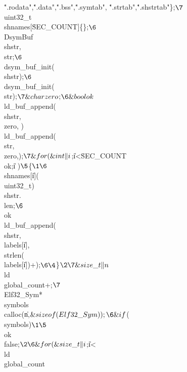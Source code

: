 \.{".rodata"},\.{".data"},\.{".bss"},\.{".symtab"},%
\.{".strtab"},\.{".shstrtab"}\};{}$\7
${}\\{uint32\_t}\\{shnames}[\.{SEC\_COUNT}]\K\{\};{}$\6
${}\\{DsymBuf}\\{shstr},\\{str};{}$\6
${}\\{dsym\_buf\_init}({\AND}\\{shstr});{}$\6
${}\\{dsym\_buf\_init}({\AND}\\{str});{}$\7
\&{char} \\{zero}${}\K{};{}$\6
\&{bool} \\{ok}${}\K\\{ld\_buf\_append}({\AND}\\{shstr},\\{zero},%
)\W\\{ld\_buf\_append}({\AND}\\{str},\\{zero},);{}$\7
\&{for} (\&{int} \|i${}\K{};{}$ ${}\|i<\.{SEC\_COUNT}\W\\{ok};{}$ ${}\|i%
\PP){}$\5
${}\{{}$\1\6
${}\\{shnames}[\|i]\K(\\{uint32\_t})\\{shstr}.\\{len};{}$\6
${}\\{ok}\K\\{ld\_buf\_append}({\AND}\\{shstr},\\{labels}[\|i],%
\\{strlen}(\\{labels}[\|i])+);{}$\6
\4${}\}{}$\2\7
\&{size\_t} \|n${}\K\\{ld}\MG\\{global\_count}+;{}$\7
${}\\{Elf32\_Sym}*\\{symbols}\K\\{calloc}(\|n,$\&{sizeof} (\\{Elf32%
\_Sym}));\6
\&{if} ${}(\R\\{symbols}){}$\1\5
${}\\{ok}\K\\{false};{}$\2\6
\&{for} (\&{size\_t} \|i${}\K{};{}$ ${}\|i<\\{ld}\MG\\{global\_count}\W%

